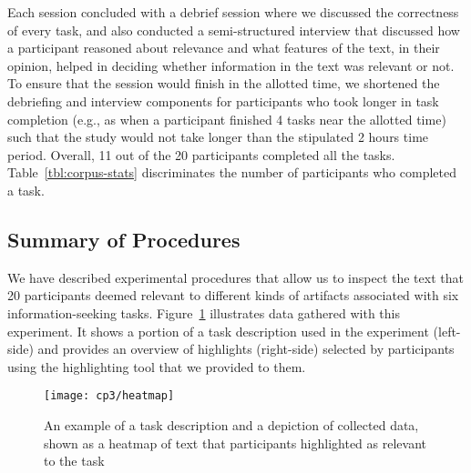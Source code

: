 


Each session concluded with a debrief session where we discussed the
correctness of every task,
and also conducted a semi-structured
interview that discussed how a participant reasoned about relevance
and what features of the text, in their opinion, helped in deciding
whether information in the text was relevant or not.
To ensure that the session would finish in the allotted time,
we shortened the debriefing and interview components 
for participants who took longer in task completion
(e.g., as when a participant finished 4 tasks near the allotted time)
such that the study would not take longer than the stipulated 2 hours time period.
Overall, 11 out of the 20 participants completed all the tasks.
Table~\ref{tbl:corpus-stats} discriminates the number of participants who completed a task.




\subsection{Summary of Procedures}


We have described experimental procedures that allow us to inspect the 
text that 20 participants deemed relevant to different kinds of artifacts 
associated with six information-seeking tasks. 
Figure~\ref{fig:task-highlights-heatmap} illustrates data gathered with this experiment. 
It shows a portion of a task description used in the experiment (left-side) and
provides an overview of highlights (right-side) selected by
participants using the highlighting tool that we provided to them.



\begin{figure}
    \centering
    \texttt{[image: cp3/heatmap]}
\caption{An example of a task description and a depiction of collected data, shown as a heatmap of text that participants highlighted as relevant to the task}
\label{fig:task-highlights-heatmap}
\end{figure}







